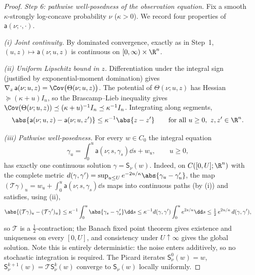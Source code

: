 \documentclass[../main.tex]{subfiles}
\begin{document}
\begin{proof}
\medskip
\noindent\emph{Step 6: pathwise well-posedness of the observation equation.}
Fix a smooth $\kappa$-strongly log-concave probability $\nu$ ($\kappa>0$).  We record
four properties of $\mathsf a(\nu;\cdot,\cdot)$.

\emph{(i) Joint continuity.}  By dominated convergence, exactly as in Step~1,
$(u,z)\mapsto\mathsf a(\nu;u,z)$ is continuous on $[0,\infty)\times\R^n$.

\emph{(ii) Uniform Lipschitz bound in $z$.}  Differentiation under the integral sign
(justified by exponential-moment domination) gives
$\nabla_z\,\mathsf a(\nu;u,z)=\Cov\bigl(\Theta(\nu;u,z)\bigr)$.  The potential of
$\Theta(\nu;u,z)$ has Hessian $\succeq(\kappa+u)I_n$, so the Brascamp--Lieb inequality
\cite{BrascampLieb1976} gives
$\Cov(\Theta(\nu;u,z))\preceq(\kappa+u)^{-1}I_n\preceq\kappa^{-1}I_n$.  Integrating
along segments,
\[
  \abs{\mathsf a(\nu;u,z)-\mathsf a(\nu;u,z')}\le\kappa^{-1}\abs{z-z'}
  \qquad\text{for all }u\ge0,\ z,z'\in\R^n .
\]

\emph{(iii) Pathwise well-posedness.}  For every $w\in C_0$ the integral equation
\begin{equation}
  \gamma_u=\int_0^u\mathsf a(\nu;s,\gamma_s)\dd s+w_u,\qquad u\ge0,
  \label{eq:sol-rdw-obs-equation}
\end{equation}
has exactly one continuous solution $\gamma=\mathsf S_\nu(w)$.  Indeed, on
$C([0,U];\R^n)$ with the complete metric
$d(\gamma,\gamma')=\sup_{u\le U}e^{-2u/\kappa}\abs{\gamma_u-\gamma'_u}$, the map
$(\mathcal T\gamma)_u=w_u+\int_0^u\mathsf a(\nu;s,\gamma_s)\dd s$ maps into continuous
paths (by (i)) and satisfies, using (ii),
\[
  \abs{(\mathcal T\gamma)_u-(\mathcal T\gamma')_u}
  \le\kappa^{-1}\int_0^u\abs{\gamma_s-\gamma'_s}\dd s
  \le\kappa^{-1}d(\gamma,\gamma')\int_0^ue^{2s/\kappa}\dd s
  \le\tfrac12\,e^{2u/\kappa}\,d(\gamma,\gamma'),
\]
so $\mathcal T$ is a $\tfrac12$-contraction; the Banach fixed point theorem gives
existence and uniqueness on every $[0,U]$, and consistency under $U\uparrow\infty$
gives the global solution.  Note this is entirely deterministic: the noise enters
additively, so no stochastic integration is required.  The Picard iterates
$\mathsf S^0_\nu(w)=w$,
$\mathsf S^{k+1}_\nu(w)=\mathcal T\mathsf S^k_\nu(w)$ converge to $\mathsf S_\nu(w)$
locally uniformly.


\end{proof}
\end{document}
